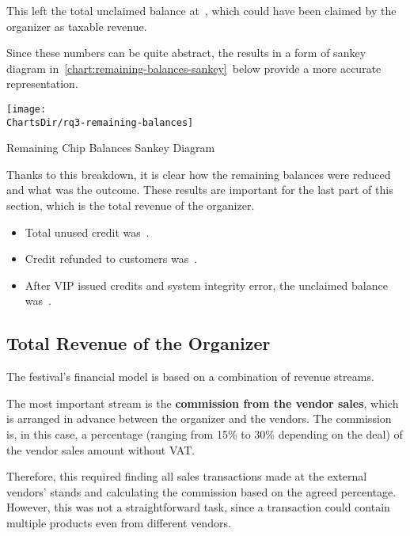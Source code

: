 This left the total unclaimed balance at~, which could have been claimed by the organizer as taxable revenue.

Since these numbers can be quite abstract, the results in a form of sankey diagram in~\autoref{chart:remaining-balances-sankey}~below provide a more accurate representation.

\begin{chart}[h]
	\centering
	\texttt{[image: \\ChartsDir/rq3-remaining-balances]}
	\caption{ Remaining Chip Balances Sankey Diagram}
	\label{chart:remaining-balances-sankey}
	\source
\end{chart}

Thanks to this breakdown, it is clear how the remaining balances were reduced and what was the outcome.
These results are important for the last part of this section, which is the total revenue of the organizer.

\begin{keytakeaways}
	\begin{itemize}
		\item Total unused credit was~.
		\item Credit refunded to customers was~.
		\item After VIP issued credits and system integrity error, the unclaimed balance was~.
	\end{itemize}
\end{keytakeaways}


\subsection{Total Revenue of the Organizer}
\label{subsec:analysis-total-revenue}

The festival's financial model is based on a combination of revenue streams.

The most important stream is the \textbf{commission from the vendor sales}, which is arranged in advance between the organizer and the vendors.
The commission is, in this case, a percentage (ranging from 15\% to 30\% depending on the deal) of the vendor sales amount without VAT\@.

Therefore, this required finding all sales transactions made at the external vendors' stands and calculating the commission based on the agreed percentage.
However, this was not a straightforward task, since a transaction could contain multiple products even from different vendors.

